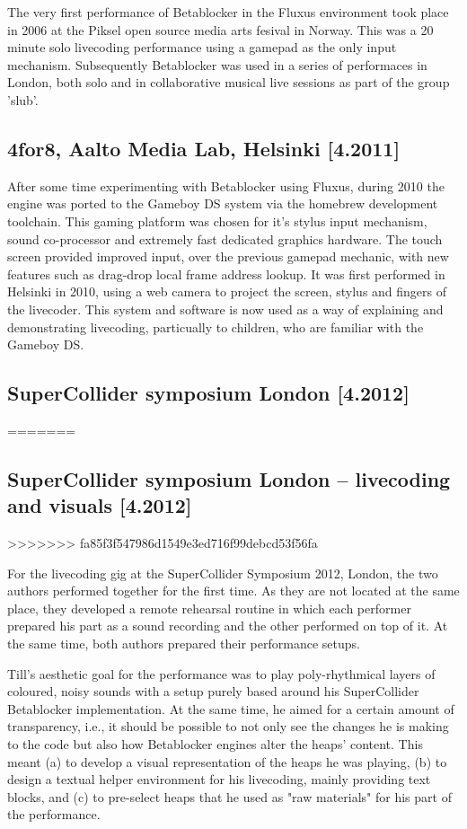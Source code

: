 \documentclass[letterpaper, 12pt]{article}
\begin{document}
The very first performance of Betablocker in the Fluxus environment took place in 2006 at the Piksel open source media arts fesival in Norway. This was a 20 minute solo livecoding performance using a gamepad as the only input mechanism. Subsequently Betablocker was used in a series of performaces in London, both solo and in collaborative musical live sessions as part of the group 'slub'. 

\subsection{4for8, Aalto Media Lab, Helsinki [4.2011]}
\label{sub:4for8}

After some time experimenting with Betablocker using Fluxus, during 2010 the engine was ported to the Gameboy DS system via the homebrew development toolchain. This gaming platform was chosen for it's stylus input mechanism, sound co-processor and extremely fast dedicated graphics hardware. The touch screen provided improved input, over the previous gamepad mechanic, with new features such as drag-drop local frame address lookup. It was first performed in Helsinki in 2010, using a web camera to project the screen, stylus and fingers of the livecoder. This system and software is now used as a way of explaining and demonstrating livecoding, particually to children, who are familiar with the Gameboy DS.


\subsection{SuperCollider symposium London [4.2012]}
=======
\parskip 18pt

\subsection{SuperCollider symposium London -- livecoding and visuals [4.2012]}
>>>>>>> fa85f3f547986d1549e3ed716f99debcd53f56fa
\label{sub:livecoding_and_visuals}

For the livecoding gig at the SuperCollider Symposium 2012, London, the two authors performed together for the first time. 
As they are not located at the same place, they developed a remote rehearsal routine in which each performer prepared his part as a sound recording and the other performed on top of it.
At the same time, both authors prepared their performance setups.

Till's aesthetic goal for the performance was to play poly-rhythmical layers of coloured, noisy sounds with a setup purely based around his SuperCollider Betablocker implementation. 
At the same time, he aimed for a certain amount of transparency, i.e., it should be possible to not only see the changes he is making to the code but also how  Betablocker engines alter the heaps' content.
This meant 
(a) to develop a visual representation of the heaps he was playing, 
(b) to design a textual helper environment for his livecoding, mainly providing text blocks, and
(c) to pre-select heaps that he used as "raw materials" for his part of the  performance.
\end{document}
